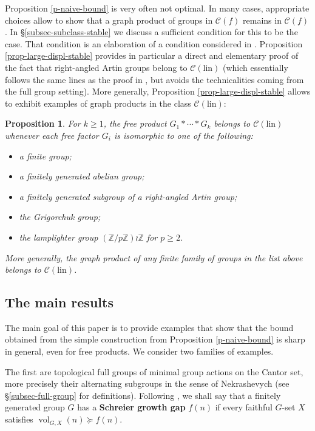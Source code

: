 \documentclass[11pt]{amsart}
\newcommand{\red}[1]{{\color{red}#1}}
\newcommand{\Z}{\ensuremath{\mathbb{Z}}}%
\newcommand{\vol}{\ensuremath{\operatorname{vol}}}%
\newcommand{\Class}{\ensuremath{\mathcal{C}}}
\newcommand{\Clin}{\ensuremath{\mathcal{C}(\mathrm{lin})}}
\theoremstyle{definition}
\theoremstyle{plain}
\newtheorem{prop-intro}[defin]{Proposition}
\theoremstyle{remark}
\begin{document}

Proposition \ref{p-naive-bound} is very often not optimal. In many cases, appropriate choices  allow to show that a graph product of groups in $\Class(f)$ remains in $\Class(f)$.  In \S \ref{subsec-subclass-stable} we discuss a sufficient condition for this to be the case. That condition is an elaboration of a condition considered in \cite{Salo-graph-prod}.  Proposition \ref{prop-large-displ-stable} provides in particular a direct and elementary proof of the fact that right-angled Artin groups belong to $\Clin$ (which essentially follows the same lines as the proof in \cite{Salo-graph-prod}, but avoids the technicalities coming from the full group setting). More generally, Proposition \ref{prop-large-displ-stable} allows to exhibit examples of graph products in the class $\Clin$:


\begin{prop-intro} \label{prop-intro-grig}
For $k\ge 1$, the free product $G_1\ast \cdots \ast G_k$ belongs to $\Clin$ whenever each free factor $G_i$ is isomorphic to one of the following:
\begin{itemize}
\item a finite group;
\item a finitely generated abelian group;
\item a finitely generated subgroup of a right-angled Artin group;
\item the Grigorchuk group;
\item the lamplighter group $(\Z/p\Z) \wr \Z$ for $p\ge 2$. 

\end{itemize}
More generally, the graph product of any finite family of groups in the list above belongs to $\Clin$.
\end{prop-intro}


\subsection{The main results}
 
The main goal of this paper is to provide examples that show that the bound obtained from the simple construction from Proposition \ref{p-naive-bound} is sharp in general, even for free products. We consider two families of examples. 

The first are topological full groups of minimal group actions on the Cantor set, more precisely their alternating subgroups in the sense of Nekrashevych \cite{Nek-simple} (see \S  \ref{subsec-full-group} for definitions).  Following \cite{LB-MB-solv}, we shall say that a finitely generated group $G$ has a \textbf{Schreier growth gap} $f(n)$ if every faithful $G$-set $X$ satisfies $\vol_{G, X}(n)\succcurlyeq f(n)$. 
\end{document}
